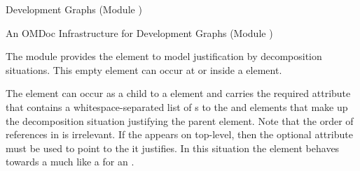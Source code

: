 \begin{omgroup}[id=complex-theories,short=Complex Theories,
                            creators=miko,contributors=frabe]
\begin{omgroup}[id=development-graphs,short=Development Graphs]{Development Graphs (Module
  {})}
\begin{module}[id=dgraph]
\begin{omgroup}[id=dg-omdoc,short=OMDoc Development Graphs]{An OMDoc Infrastructure for
  Development Graphs (Module {})}
  
\begin{definition}[id=decomposition.def]
  The {} module provides the {} element to model
  justification by decomposition situations.  This empty element can occur at
  {} or inside a {} element.
 
  The {} element can occur as a child to a
  {} element and carries the required attribute
  {} that contains a whitespace-separated list of
  {s} to the {} and {}
  elements that make up the decomposition situation justifying the parent
  {} element. Note that the order of references in
  {} is irrelevant. If the {}
  appears on top-level, then the optional {} attribute must
  be used to point to the {} it justifies. In this situation the
  {} element behaves towards a {} much
  like a {} for an {}.
\end{definition}


\end{omgroup}
\end{module}
\end{omgroup}
\end{omgroup}
